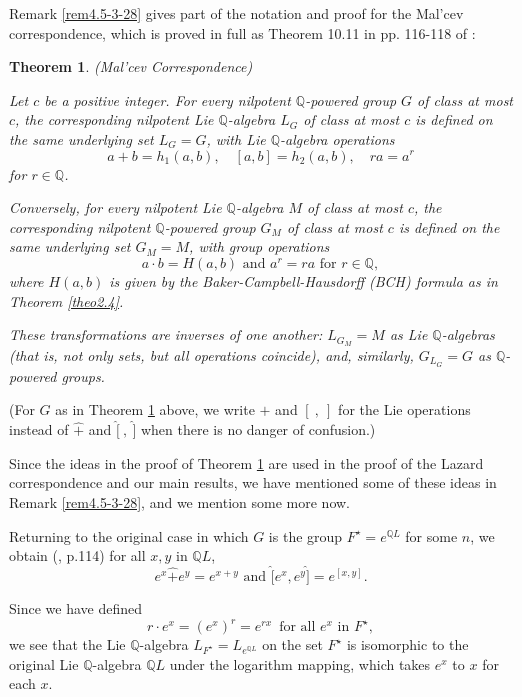 \documentclass[mathscr]{amsart}
\theoremstyle{theorem}
\newtheorem{theorem}{Theorem}[section]
\theoremstyle{definition}
\numberwithin{equation}{section}
\def \({\left(}
\def \){\right)}
\begin{document}
Remark \ref{rem4.5-3-28} gives part of the notation and proof for
the Mal'cev correspondence, which is proved in full as Theorem 10.11
in pp. 116-118 of \cite{Kh}:

\begin{theorem}(Mal'cev Correspondence)\label{theo4.6-3-28}

Let $c$ be a positive integer.  For every nilpotent
$\mathbb{Q}$-powered group $G$ of class at most $c$, the
corresponding nilpotent Lie $\mathbb{Q}$-algebra $L_G$ of class at
most $c$ is defined on the same underlying set $L_G=G$, with Lie
$\mathbb{Q}$-algebra operations
$$
a+b=h_1(a,b),\quad[a,b]=h_2(a,b),\quad ra=a^r
$$
for $r\in \mathbb{Q}$.

Conversely, for every nilpotent Lie $\mathbb{Q}$-algebra $M$ of
class at most $c$, the corresponding nilpotent $\mathbb{Q}$-powered
group $G_M$ of class at most $c$ is defined on the same underlying
set $G_M=M$, with group operations
$$
a\cdot b=H(a,b)\text{ and }a^r=ra\text{ for }r\in\mathbb{Q},
$$
where $H(a,b)$ is given by the Baker-Campbell-Hausdorff (BCH)
formula as in Theorem \ref{theo2.4}.

These transformations are inverses of one another: $L_{G_M}=M$ as
Lie $\mathbb{Q}$-algebras (that is, not only sets, but all
operations coincide), and, similarly, $G_{L_G}=G$ as
$\mathbb{Q}$-powered groups.
\end{theorem}

(For $G$ as in Theorem \ref{theo4.6-3-28} above, we write $+$ and
$[\ ,\ ]$ for the Lie operations instead of $\hat +$ and $\hat[\ ,\
\hat]$ when there is no danger of confusion.)

Since the ideas in the proof of Theorem \ref{theo4.6-3-28}
 are used in the proof of the Lazard correspondence and our main
 results, we have mentioned some of these ideas in Remark \ref{rem4.5-3-28}, and
we mention some more now.

Returning to the original case in which $G$ is the group
$F^{\star}=e^{\mathbb{Q}L}$ for some $n$, we obtain (\cite{Kh},
p.114) for all $x,y$ in $\mathbb{Q}L$,
\begin{equation}\label{eq3.6}
e^x\hat+e^y=e^{x+y}\text{ and }\hat[e^x,e^y \hat]=e^{[x,y]}.
\end{equation}

Since we have defined
\begin{equation}\label{eq3.7}
r\cdot e^x=\(e^x\)^r=e^{rx}\,\text{ for all }e^x\text{ in }F^\star,
\end{equation}
we see that the Lie $\mathbb{Q}$-algebra
$L_{F^\star}=L_{e^{\mathbb{Q}L}}$ on the set $F^\star$ is isomorphic
to the original Lie $\mathbb{Q}$-algebra $\mathbb{Q}L$ under the
logarithm mapping, which takes $e^x$ to $x$ for each $x$.
\end{document}
